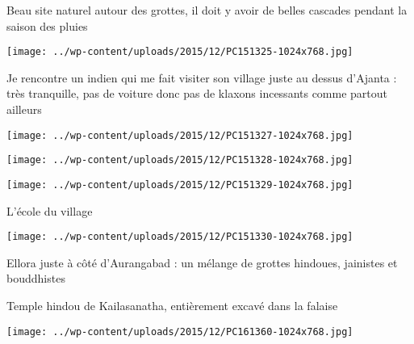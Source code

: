 

 Beau site naturel autour des grottes, il doit y avoir de belles cascades pendant la saison des pluies 

 

\begin{center} \texttt{[image: ../wp-content/uploads/2015/12/PC151325-1024x768.jpg]} \end{center}

 

 Je rencontre un indien qui me fait visiter son village juste au dessus d'Ajanta : très tranquille, pas de voiture donc pas de klaxons incessants comme partout ailleurs 

 

\begin{center} \texttt{[image: ../wp-content/uploads/2015/12/PC151327-1024x768.jpg]} \end{center}

 

 

\begin{center} \texttt{[image: ../wp-content/uploads/2015/12/PC151328-1024x768.jpg]} \end{center}

 

 

\begin{center} \texttt{[image: ../wp-content/uploads/2015/12/PC151329-1024x768.jpg]} \end{center}

 

 L'école du village 

 

\begin{center} \texttt{[image: ../wp-content/uploads/2015/12/PC151330-1024x768.jpg]} \end{center}

 

 Ellora juste à côté d'Aurangabad : un mélange de grottes hindoues, jainistes et bouddhistes 

 Temple hindou de Kailasanatha, entièrement excavé dans la falaise 

 

\begin{center} \texttt{[image: ../wp-content/uploads/2015/12/PC161360-1024x768.jpg]} \end{center}

 

